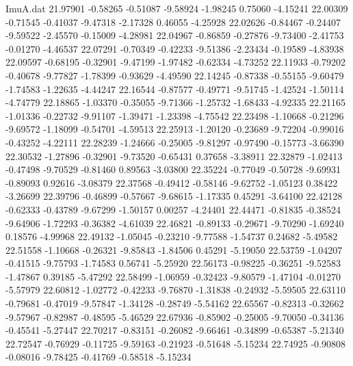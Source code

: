 \begin{filecontents}{ImuA.dat}
  21.97901   -0.58265   -0.51087   -9.58924   -1.98245    0.75060   -4.15241
  22.00309   -0.71545   -0.41037   -9.47318   -2.17328    0.46055   -4.25928
  22.02626   -0.84467   -0.24407   -9.59522   -2.45570   -0.15009   -4.28981
  22.04967   -0.86859   -0.27876   -9.73400   -2.41753   -0.01270   -4.46537
  22.07291   -0.70349   -0.42233   -9.51386   -2.23434   -0.19589   -4.83938
  22.09597   -0.68195   -0.32901   -9.47199   -1.97482   -0.62334   -4.73252
  22.11933   -0.79202   -0.40678   -9.77827   -1.78399   -0.93629   -4.49590
  22.14245   -0.87338   -0.55155   -9.60479   -1.74583   -1.22635   -4.44247
  22.16544   -0.87577   -0.49771   -9.51745   -1.42524   -1.50114   -4.74779
  22.18865   -1.03370   -0.35055   -9.71366   -1.25732   -1.68433   -4.92335
  22.21165   -1.01336   -0.22732   -9.91107   -1.39471   -1.23398   -4.75542
  22.23498   -1.10668   -0.21296   -9.69572   -1.18099   -0.54701   -4.59513
  22.25913   -1.20120   -0.23689   -9.72204   -0.99016   -0.43252   -4.22111
  22.28239   -1.24666   -0.25005   -9.81297   -0.97490   -0.15773   -3.66390
  22.30532   -1.27896   -0.32901   -9.73520   -0.65431    0.37658   -3.38911
  22.32879   -1.02413   -0.47498   -9.70529   -0.81460    0.89563   -3.03800
  22.35224   -0.77049   -0.50728   -9.69931   -0.89093    0.92616   -3.08379
  22.37568   -0.49412   -0.58146   -9.62752   -1.05123    0.38422   -3.26699
  22.39796   -0.46899   -0.57667   -9.68615   -1.17335    0.45291   -3.64100
  22.42128   -0.62333   -0.43789   -9.67299   -1.50157    0.00257   -4.24401
  22.44471   -0.81835   -0.38524   -9.64906   -1.72293   -0.36382   -4.61039
  22.46821   -0.89133   -0.29671   -9.70290   -1.69240    0.18576   -4.99968
  22.49132   -1.05045   -0.23210   -9.77588   -1.54737    0.24682   -5.49582
  22.51558   -1.10668   -0.26321   -9.85843   -1.84506    0.45291   -5.19050
  22.53759   -1.04207   -0.41515   -9.75793   -1.74583    0.56741   -5.25920
  22.56173   -0.98225   -0.36251   -9.52583   -1.47867    0.39185   -5.47292
  22.58499   -1.06959   -0.32423   -9.80579   -1.47104   -0.01270   -5.57979
  22.60812   -1.02772   -0.42233   -9.76870   -1.31838   -0.24932   -5.59505
  22.63110   -0.79681   -0.47019   -9.57847   -1.34128   -0.28749   -5.54162
  22.65567   -0.82313   -0.32662   -9.57967   -0.82987   -0.48595   -5.46529
  22.67936   -0.85902   -0.25005   -9.70050   -0.34136   -0.45541   -5.27447
  22.70217   -0.83151   -0.26082   -9.66461   -0.34899   -0.65387   -5.21340
  22.72547   -0.76929   -0.11725   -9.59163   -0.21923   -0.51648   -5.15234
  22.74925   -0.90808   -0.08016   -9.78425   -0.41769   -0.58518   -5.15234

\end{filecontents}
